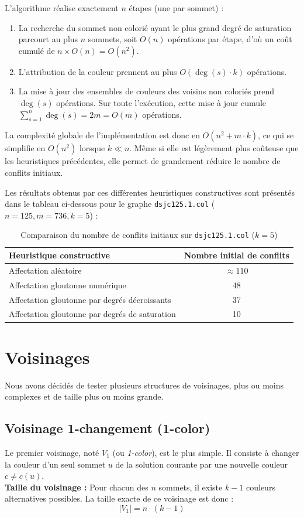 \documentclass{article}
\begin{document}
L'algorithme réalise exactement $n$ étapes (une par sommet) :
\begin{enumerate}
    \item La recherche du sommet non colorié ayant le plus grand degré de saturation parcourt au plus $n$ sommets, soit $O(n)$ opérations par étape, d'où un coût cumulé de $n \times O(n) = O(n^2)$.
    \item L'attribution de la couleur prennent au plus $O(\deg(s) \cdot k)$ opérations.
    \item La mise à jour des ensembles de couleurs des voisins non coloriés prend $\deg(s)$ opérations. Sur toute l'exécution, cette mise à jour cumule $\sum_{s=1}^n \deg(s) = 2m = O(m)$ opérations.
\end{enumerate}
La complexité globale de l'implémentation est donc en $O(n^2 + m \cdot k)$, ce qui se simplifie en $O(n^2)$ lorsque $k \ll n$. Même si elle est légèrement plus coûteuse que les heuristiques précédentes, elle permet de grandement réduire le nombre de conflits initiaux.

Les résultats obtenus par ces différentes heuristiques constructives sont présentés dans le tableau ci-dessous pour le graphe \texttt{dsjc125.1.col} ($n = 125, m = 736, k = 5$) :

\begin{table}[H]
\centering
\begin{tabular}{lc}
\toprule
\textbf{Heuristique constructive} & \textbf{Nombre initial de conflits} \\
\midrule
Affectation aléatoire & $\approx 110$ \\
Affectation gloutonne numérique & 48 \\
Affectation gloutonne par degrés décroissants & 37 \\
Affectation gloutonne par degrés de saturation & 10 \\
\bottomrule
\end{tabular}
\caption{Comparaison du nombre de conflits initiaux sur \texttt{dsjc125.1.col} ($k=5$)}
\label{tab:heuristiques_initiales}
\end{table}


\section{Voisinages}
Nous avons décidés de tester plusieurs structures de voisinages, plus ou moins complexes et de taille plus ou moins grande.

\subsection{Voisinage 1-changement (1-color)}
Le premier voisinage, noté $V_1$ (ou \textit{1-color}), est le plus simple. Il consiste à changer la couleur d'un seul sommet $u$ de la solution courante par une nouvelle couleur $c \neq c(u)$.\\
\textbf{Taille du voisinage : } Pour chacun des $n$ sommets, il existe $k - 1$ couleurs alternatives possibles. La taille exacte de ce voisinage est donc :
\[
|V_1| = n \cdot (k - 1)
\]
\end{document}

